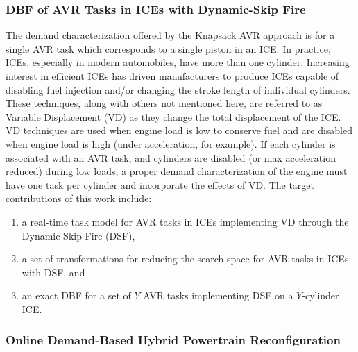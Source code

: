 \subsubsection{DBF of AVR Tasks in ICEs with Dynamic-Skip Fire}

The demand characterization offered by the Knapsack AVR approach is for a single AVR task which corresponds to a single piston in an ICE.
In practice, ICEs, especially in modern automobiles, have more than one cylinder.
Increasing interest in efficient ICEs has driven manufacturers to produce ICEs capable of disabling fuel injection and/or changing the stroke length of individual cylinders.
These techniques, along with others not mentioned here, are referred to as Variable Displacement (VD) as they change the total displacement of the ICE.
VD techniques are used when engine load is low to conserve fuel and are disabled when engine load is high (under acceleration, for example).
If each cylinder is associated with an AVR task, and cylinders are disabled (or max acceleration reduced) during low loads, a proper demand characterization of the engine must have one task per cylinder and incorporate the effects of VD.
The target contributions of this work include:
\begin{enumerate}
    \item a real-time task model for AVR tasks in ICEs implementing VD through the Dynamic Skip-Fire (DSF),
    \item a set of transformations for reducing the search space for AVR tasks in ICEs with DSF, and
    \item an exact DBF for a set of $Y$ AVR tasks implementing DSF on a $Y$-cylinder ICE.
\end{enumerate}

\subsubsection{Online Demand-Based Hybrid Powertrain Reconfiguration}

